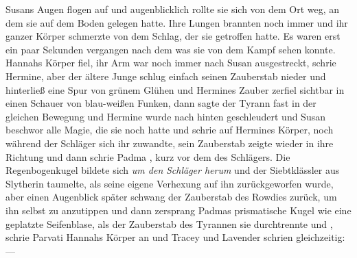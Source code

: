 Susans Augen flogen auf und augenblicklich rollte sie sich von dem Ort weg, an dem sie auf dem Boden gelegen hatte. Ihre Lungen brannten noch immer und ihr ganzer Körper schmerzte von dem Schlag, der sie getroffen hatte. Es waren erst ein paar Sekunden vergangen nach dem was sie von dem Kampf sehen konnte. Hannahs Körper fiel, ihr Arm war noch immer nach Susan ausgestreckt,  schrie Hermine, aber der ältere Junge schlug einfach seinen Zauberstab nieder und hinterließ eine Spur von grünem Glühen und Hermines Zauber zerfiel sichtbar in einen Schauer von blau-weißen Funken, dann sagte der Tyrann fast in der gleichen Bewegung  und Hermine wurde nach hinten geschleudert und Susan beschwor alle Magie, die sie noch hatte und schrie  auf Hermines Körper, noch während der Schläger sich ihr zuwandte, sein Zauberstab zeigte wieder in ihre Richtung und dann schrie Padma , kurz vor dem  des Schlägers. Die Regenbogenkugel bildete sich \emph{um den} \emph{Schläger herum} und der Siebtklässler aus Slytherin taumelte, als seine eigene Verhexung auf ihn zurückgeworfen wurde, aber einen Augenblick später schwang der Zauberstab des Rowdies zurück, um ihn selbst zu anzutippen und dann zersprang Padmas prismatische Kugel wie eine geplatzte Seifenblase, als der Zauberstab des Tyrannen sie durchtrennte und , schrie Parvati Hannahs Körper an und Tracey und Lavender schrien gleichzeitig:  —

